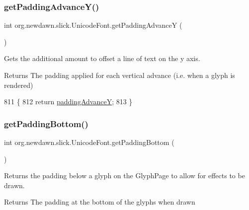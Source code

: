 \subsubsection{\texorpdfstring{get\+Padding\+Advance\+Y()}{getPaddingAdvanceY()}}
{\footnotesize\ttfamily int org.\+newdawn.\+slick.\+Unicode\+Font.\+get\+Padding\+AdvanceY (\begin{DoxyParamCaption}{ }\end{DoxyParamCaption})\hspace{0.3cm}{\ttfamily [inline]}}

Gets the additional amount to offset a line of text on the y axis.

\begin{DoxyReturn}{Returns}
The padding applied for each vertical advance (i.\+e. when a glyph is rendered) 
\end{DoxyReturn}

\begin{DoxyCode}
811                                      \{
812         \textcolor{keywordflow}{return} \mbox{\hyperlink{classorg_1_1newdawn_1_1slick_1_1_unicode_font_ac04c92b5304822a4187a2e7184f4aca8}{paddingAdvanceY}};
813     \}
\end{DoxyCode}
\mbox{\label{classorg_1_1newdawn_1_1slick_1_1_unicode_font_a219e5cb9fec3686abec0906668a89b6c}} 
\subsubsection{\texorpdfstring{get\+Padding\+Bottom()}{getPaddingBottom()}}
{\footnotesize\ttfamily int org.\+newdawn.\+slick.\+Unicode\+Font.\+get\+Padding\+Bottom (\begin{DoxyParamCaption}{ }\end{DoxyParamCaption})\hspace{0.3cm}{\ttfamily [inline]}}

Returns the padding below a glyph on the Glyph\+Page to allow for effects to be drawn.

\begin{DoxyReturn}{Returns}
The padding at the bottom of the glyphs when drawn 
\end{DoxyReturn}


